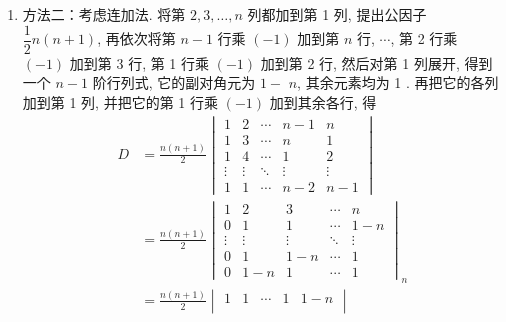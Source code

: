 \begin{enumerate}
\begin{enumerate}
\begin{enumerate}
                        \item 方法二：考虑连加法. 将第 $2,3, \ldots, n$ 列都加到第 1 列, 提出公因子 $\dfrac{1}{2} n(n+1)$, 再依次将第 $n-1$ 行乘 $(-1)$ 加到第 $n$ 行, $\cdots$, 第 2 行乘 $(-1)$ 加到第 3 行, 第 1 行乘 $(-1)$ 加到第 2 行, 然后对第 1 列展开, 得到一个 $n-1$ 阶行列式, 它的副对角元为 $1-$ $n$, 其余元素均为 1 . 再把它的各列加到第 1 列, 并把它的第 1 行乘 $(-1)$ 加到其余各行, 得
                              \begin{align*}
                                  D & =\frac{n(n+1)}{2}\begin{vmatrix}
                                                           1      & 2      & \cdots & n-1    & n      \\
                                                           1      & 3      & \cdots & n      & 1      \\
                                                           1      & 4      & \cdots & 1      & 2      \\
                                                           \vdots & \vdots & \ddots & \vdots & \vdots \\
                                                           1      & 1      & \cdots & n-2    & n-1
                                                       \end{vmatrix} \\
                                    & =\frac{n(n+1)}{2}\begin{vmatrix}
                                                           1      & 2      & 3      & \cdots & n      \\
                                                           0      & 1      & 1      & \cdots & 1-n    \\
                                                           \vdots & \vdots & \vdots & \ddots & \vdots \\
                                                           0      & 1      & 1-n    & \cdots & 1      \\
                                                           0      & 1-n    & 1      & \cdots & 1
                                                       \end{vmatrix}_{n} \\
                                    & =\frac{n(n+1)}{2}
                                  \begin{vmatrix}
                                      1      & 1      & \cdots & 1      & 1-n \\

\end{vmatrix}
\end{align*}
\end{enumerate}
\end{enumerate}
\end{enumerate}
